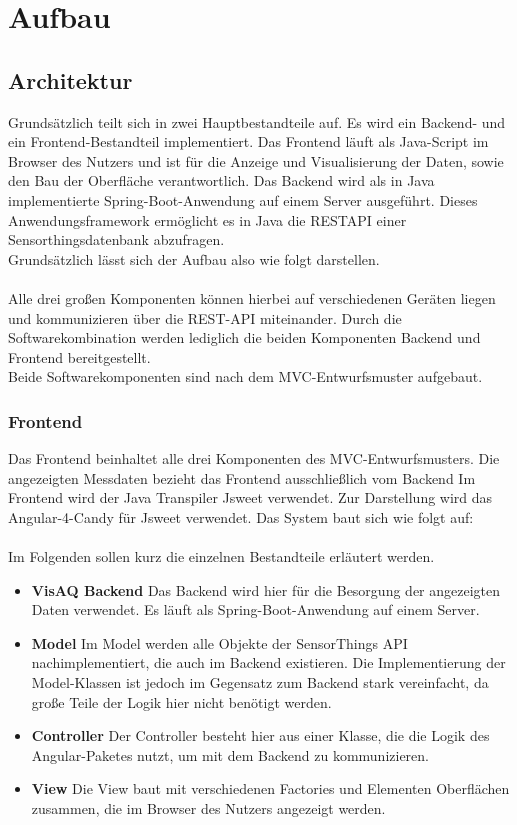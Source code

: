 \section{Aufbau}
\subsection{Architektur}
Grundsätzlich teilt sich \softwarename in zwei Hauptbestandteile auf.
Es wird ein Backend- und ein Frontend-Bestandteil implementiert.
Das Frontend läuft als Java-Script im Browser des Nutzers und ist für die Anzeige und Visualisierung der Daten, sowie den Bau der Oberfläche verantwortlich.
Das Backend wird als in Java implementierte Spring-Boot-Anwendung auf einem Server ausgeführt.
Dieses Anwendungsframework ermöglicht es in Java die \gls{RESTAPI} einer Sensorthingsdatenbank abzufragen.
\\
Grundsätzlich lässt sich der Aufbau also wie folgt darstellen.
\\

\\
Alle drei großen Komponenten können hierbei auf verschiedenen Geräten liegen und kommunizieren über die REST-API miteinander.
Durch die Softwarekombination \softwarename werden lediglich die beiden Komponenten \softwarename Backend und \softwarename Frontend bereitgestellt.
\\
Beide Softwarekomponenten sind nach dem \gls{MVC}-Entwurfsmuster aufgebaut.
\subsubsection{Frontend}
Das Frontend beinhaltet alle drei Komponenten des \gls{MVC}-Entwurfsmusters. Die angezeigten Messdaten bezieht das \softwarename Frontend ausschließlich vom \softwarename Backend
Im Frontend wird der Java Transpiler \gls{Jsweet} verwendet. Zur Darstellung wird das \gls{Angular-4-Candy} für \gls{Jsweet} verwendet.
Das System baut sich wie folgt auf:
\\

\\
Im Folgenden sollen kurz die einzelnen Bestandteile erläutert werden.
\begin{itemize}
    \item \textbf{VisAQ Backend} Das \softwarename Backend wird hier für die Besorgung der angezeigten Daten verwendet. Es läuft als Spring-Boot-Anwendung auf einem Server.
    \item \textbf{Model} Im Model werden alle Objekte der \gls{SensorThings API} nachimplementiert, die auch im Backend existieren.
    Die Implementierung der Model-Klassen ist jedoch im Gegensatz zum Backend stark vereinfacht, da große Teile der Logik hier nicht benötigt werden.
    \item \textbf{Controller} Der Controller besteht hier aus einer Klasse, die die Logik des Angular-Paketes nutzt, um mit dem Backend zu kommunizieren.
    \item \textbf{View} Die View baut mit verschiedenen Factories und Elementen Oberflächen zusammen, die im Browser des Nutzers angezeigt werden.
\end{itemize}
\clearpage
